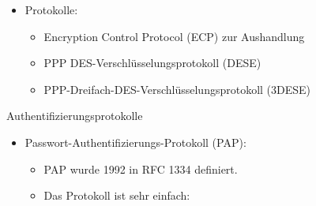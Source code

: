 \documentclass[a4paper]{article}
\begin{document}
\begin{multicols}{3}
\begin{itemize}
              \begin{itemize}
                  \item
                        Protokolle:

                        \begin{itemize}
                            \item
                                  Encryption Control Protocol (ECP) zur Aushandlung
                            \item
                                  PPP DES-Verschlüsselungsprotokoll (DESE)
                            \item
                                  PPP-Dreifach-DES-Verschlüsselungsprotokoll (3DESE)
                        \end{itemize}
              \end{itemize}
    \end{itemize}

    Authentifizierungsprotokolle

    \begin{itemize}
        \item
              Passwort-Authentifizierungs-Protokoll (PAP):

              \begin{itemize}
                  \item
                        PAP wurde 1992 in RFC 1334 definiert.
                  \item
                        Das Protokoll ist sehr einfach:


\end{itemize}
\end{itemize}
\end{multicols}
\end{document}
